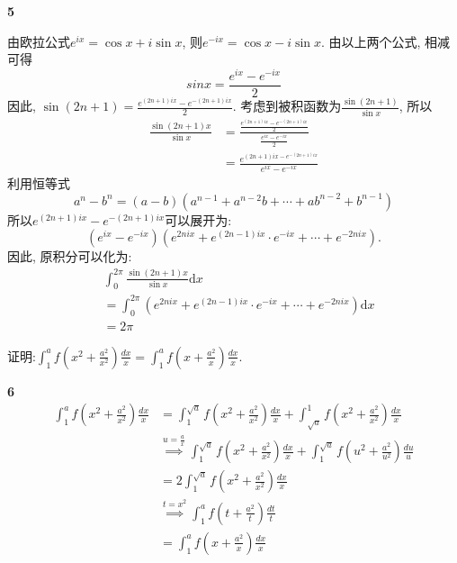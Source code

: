 \documentclass[12pt]{article}
\newenvironment{solution}[2][Solution]{\begin{trivlist}
\item[\hskip \labelsep {\bfseries #1}]}{\end{trivlist}}
\newenvironment{problem}[2][Problem]{\begin{trivlist}
\item[\hskip \labelsep {\bfseries #1}\hskip \labelsep {\bfseries #2.}]}{\end{trivlist}}
\begin{document}
\begin{solution}{5} \textbf{5}
    
    由欧拉公式$e^{ix} = \cos x + i\sin x$, 则$\displaystyle e^{-ix} = \cos x - i\sin x$. 由以上两个公式, 相减可得
    \begin{equation} \label{eq:01}
        sinx = \frac{e^{ix} - e^{-ix}}{2}    
    \end{equation}
    因此, $\displaystyle\sin(2n+1) = \frac{e^{(2n+1)ix} - e^{-(2n+1)ix}}{2}$. 考虑到被积函数为$\displaystyle\frac{\sin(2n+1)}{\sin x}$, 所以
    \[
        \begin{aligned}
            \frac{\sin(2n+1)x}{\sin x} &= \frac{\frac{e^{(2n+1)ix}-e^{-(2n+1)ix}}{2}}{\frac{e^{ix} - e^{-ix}}{2}} \\
            &= \frac{e^{(2n+1)ix - e^{-(2n+1)ix}}}{e^{ix} - e^{-ix}}    
        \end{aligned}
    \]
    利用恒等式
    \[
        a^n - b^n = (a-b)(a^{n-1} + a^{n-2}b + \cdots + ab^{n-2} + b^{n-1})    
    \]
    所以$e^{(2n+1)ix} - e^{-(2n+1)ix}$可以展开为:
    \[
        (e^{ix} - e^{-ix})(e^{2nix} + e^{(2n-1)ix}\cdot e^{-ix} + \cdots + e^{-2nix}).    
    \]
    因此, 原积分可以化为:
    \[
        \begin{aligned}
            &\int_0^{2\pi} \frac{\sin(2n+1)x}{\sin x}\mathrm{d}x \\
            &= \int_0^{2\pi} \left( e^{2nix} + e^{(2n-1)ix}\cdot e^{-ix} + \cdots + e^{-2nix} \right)\mathrm{d}x \\
            &= 2\pi
        \end{aligned}    
    \]
\end{solution}

\begin{problem}{6}
证明:$\displaystyle\int_1^a f(x^2+\frac{a^2}{x^2})\frac{dx}{x} = \int_1^a f(x+\frac{a^2}{x})\frac{dx}{x}.$
\end{problem}

\begin{solution}{6} \textbf{6}
\[
\begin{aligned}
	\int_1^a f(x^2 + \frac{a^2}{x^2})\frac{dx}{x} &= \int_1^{\sqrt{a}} f(x^2+\frac{a^2}{x^2})\frac{dx}{x} + \int_{\sqrt{a}}^1 f(x^2+\frac{a^2}{x^2})\frac{dx}{x} \\ &\stackrel{u=\frac{a}{x}}\implies \int_1^{\sqrt{a}} f(x^2+\frac{a^2}{x^2})\frac{dx}{x} + \int_1^{\sqrt{a}}f(u^2+\frac{a^2}{u^2})\frac{du}{u} \\
&=2\int_1^{\sqrt{a}} f(x^2+\frac{a^2}{x^2})\frac{dx}{x}\\
&\stackrel{t=x^2}\implies \int_1^a f(t+\frac{a^2}{t})\frac{dt}{t}\\
&=\int_1^a f(x+\frac{a^2}{x})\frac{dx}{x}
\end{aligned}
\]
\end{solution}
\end{document}
